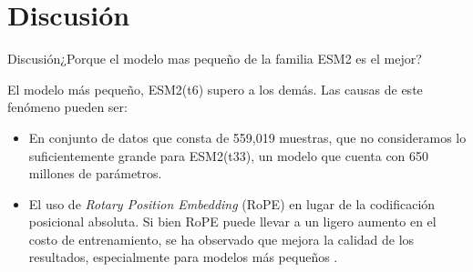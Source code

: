 \documentclass[10pt]{beamer}
\newcommand{\1}{
	\setbeamertemplate{background}{
		\texttt{[image: img/1]}
		\tikz[overlay] \fill[fill opacity=0.75,fill=white] (0,0) rectangle (-\paperwidth,\paperheight);
	}
}
\begin{document}
\section{Discusión}




\begin{frame}{Discusión}{¿Porque el modelo mas pequeño de la familia ESM2 es el mejor?}
	
	\begin{block}{}
		El modelo más pequeño, ESM2(t6) supero a los demás. Las causas de este fenómeno pueden ser: 
	
	\end{block}
	
	\pause
	
	\begin{block}{}
		\begin{itemize}
			\item En conjunto de datos que consta de 559,019 muestras, que no consideramos lo suficientemente grande para ESM2(t33), un modelo que cuenta con 650 millones de parámetros. \pause
			
			\item El uso de \textit{Rotary Position Embedding} (RoPE) en lugar de la codificación posicional absoluta. Si bien RoPE puede llevar a un ligero aumento en el costo de entrenamiento, se ha observado que mejora la calidad de los resultados, especialmente para modelos más pequeños \cite{lin2023evolutionary}.
		\end{itemize}
	\end{block}
	
\end{frame}

	
	
\end{document}
